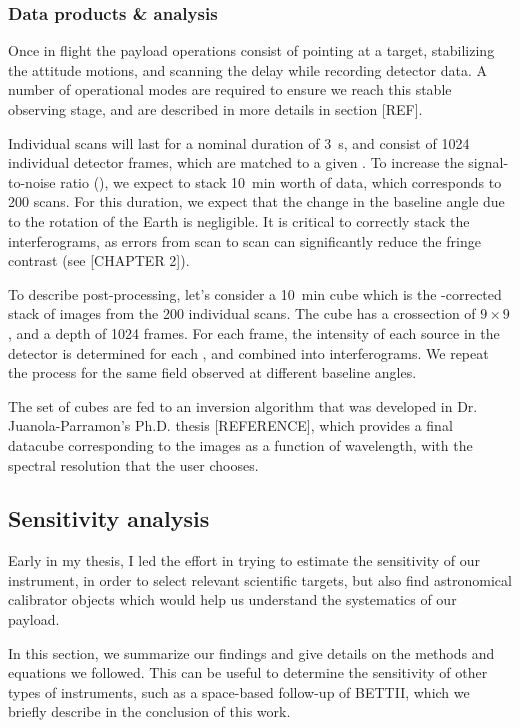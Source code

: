 \subsubsection{Data products \& analysis}


Once in flight the payload operations consist of pointing at a target, stabilizing the attitude motions, and scanning the delay while recording detector data. A number of operational modes are required to ensure we reach this stable observing stage, and are described in more details in section [REF]. 

Individual scans will last for a nominal duration of \SI{3}{\second}, and consist of \si{1024} individual detector frames, which are matched to a given \OPD. To increase the signal-to-noise ratio (\SNR), we expect to stack \SI{10}{\minute} worth of data, which corresponds to 200 scans. For this duration, we expect that the change in the baseline angle due to the rotation of the Earth is negligible. It is critical to correctly stack the interferograms, as \OPD errors from scan to scan can significantly reduce the fringe contrast (see [CHAPTER 2]).

To describe post-processing, let's consider a \SI{10}{\minute} cube which is the {\OPD}-corrected stack of images from the 200 individual scans. The cube has a crossection of $9\times 9$, and a depth of 1024 frames. For each frame, the intensity of each source in the detector is determined for each \OPD, and combined into interferograms. We repeat the process for the same field observed at different baseline angles. 

The set of cubes are fed to an inversion algorithm that was developed in Dr. Juanola-Parramon's Ph.D. thesis [REFERENCE], which provides a final datacube corresponding to the images as a function of wavelength, with the spectral resolution that the user chooses. 


\subsection{Sensitivity analysis}

Early in my thesis, I led the effort in trying to estimate the sensitivity of our instrument, in order to select relevant scientific targets, but also find astronomical calibrator objects which would help us understand the systematics of our payload.

In this section, we summarize our findings and give details on the methods and equations we followed. This can be useful to determine the sensitivity of other types of instruments, such as a space-based follow-up of BETTII, which we briefly describe in the conclusion of this work.


